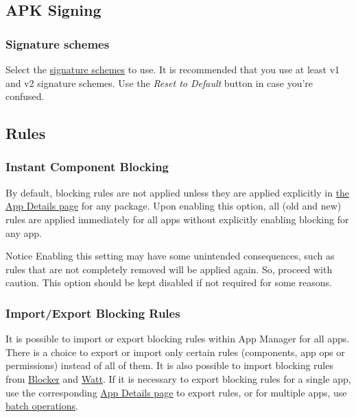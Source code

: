 \subsection{APK Signing}\label{subsec:apk-signing}

\subsubsection{Signature schemes}
Select the \href{https://source.android.com/security/apksigning}{signature schemes} to use. It is recommended that you
use at least v1 and v2 signature schemes. Use the \textit{Reset to Default} button in case you're confused.

\subsection{Rules}\label{subsec:rules}

\subsubsection{Instant Component Blocking}\label{subsubsec:instant-component-blocking}
By default, blocking rules are not applied unless they are applied explicitly in \hyperref[sec:app-details-page]{the App
Details page} for any package. Upon enabling this option, all (old and new) rules are applied immediately for all apps
without explicitly enabling blocking for any app.

\begin{warning}{Notice}
    Enabling this setting may have some unintended consequences, such as rules that are not completely removed will be
    applied again. So, proceed with caution. This option should be kept disabled if not required for some reasons.
\end{warning}


\subsubsection{Import/Export Blocking Rules}
It is possible to import or export blocking rules within App Manager for all apps. There is a choice to export or import
only certain rules (components, app ops or permissions) instead of all of them. It is also possible to import blocking
rules from \href{https://github.com/lihenggui/blocker}{Blocker} and \href{https://github.com/tuyafeng/Watt}{Watt}. If it
is necessary to export blocking rules for a single app, use the corresponding \hyperref[sec:app-details-page]{App
Details page} to export rules, or for multiple apps, use \hyperref[subsec:batch-operations]{batch operations}.

